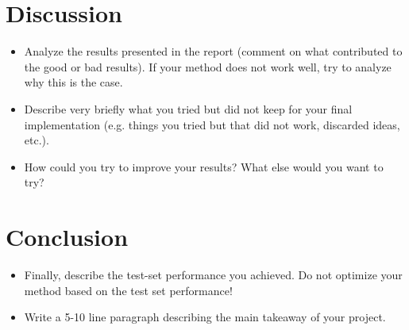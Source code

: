 \documentclass[a4, 10 pt, conference]{ieeeconf}  %
\begin{document}
\section{Discussion}
\label{sec:discuss}

{\color{blue}
  \begin{itemize}
    \item Analyze the results presented in the report (comment on what contributed to the good or bad results). If your method does not work well, try to analyze why this is the case.
    \item Describe very briefly what you tried but did not keep for your final implementation (e.g. things you tried but that did not work, discarded ideas, etc.).
    \item How could you try to improve your results? What else would you want to try?

  \end{itemize}
}


\section{Conclusion}
\label{sec:con}

{\color{blue}

  \begin{itemize}
    \item Finally, describe the test-set performance you achieved. Do not
          optimize your method based on the test set performance!
    \item Write a 5-10 line paragraph describing the main takeaway of your project.
  \end{itemize}

}

\end{document}
